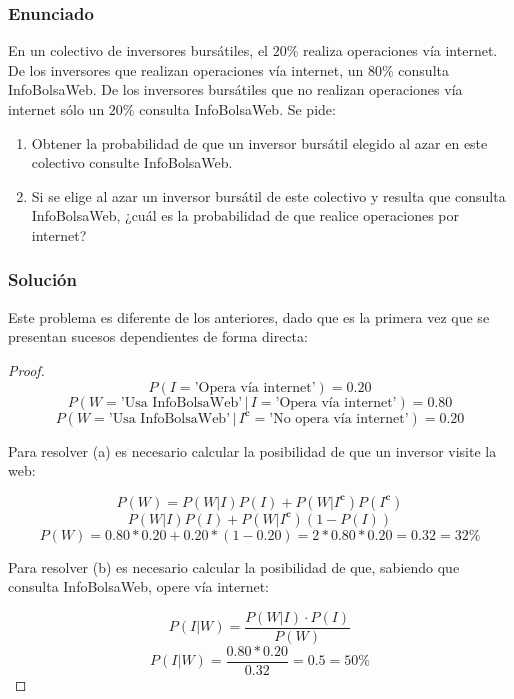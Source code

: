 \documentclass[12pt,a4paper]{article}
\begin{document}
\subsubsection{Enunciado}

En un colectivo de inversores bursátiles, el \(20\%\) realiza operaciones vía internet. De los inversores que realizan operaciones vía internet, un \(80\%\) consulta InfoBolsaWeb. De los inversores bursátiles que no realizan operaciones vía internet sólo un \(20\%\) consulta InfoBolsaWeb. Se pide:
\begin{enumerate}
  \item[a)] Obtener la probabilidad de que un inversor bursátil elegido al azar en este colectivo consulte InfoBolsaWeb.
  \item[b)] Si se elige al azar un inversor bursátil de este colectivo y resulta que consulta InfoBolsaWeb, ¿cuál es la probabilidad de que realice operaciones por internet?
\end{enumerate}

\subsubsection{Solución}

Este problema es diferente de los anteriores, dado que es la primera vez que se presentan sucesos dependientes de forma directa:

\begin{proof}

  \begin{equation*}
    P(I = \text{'Opera vía internet'})=0.20
  \end{equation*}
  \begin{equation*}
    P(W = \text{'Usa InfoBolsaWeb'}\,|\,I = \text{'Opera vía internet'})=0.80
  \end{equation*}
  \begin{equation*}
    P(W = \text{'Usa InfoBolsaWeb'}\,|\,I^{\textbf{c}} = \text{'No opera vía internet'})=0.20
  \end{equation*}

  Para resolver (a) es necesario calcular la posibilidad de que un inversor visite la web:

  \begin{equation*}
    P(W)=P(W|I)P(I)+P(W|I^{\textbf{c}})P(I^{\textbf{c}})
  \end{equation*}
  \begin{equation*}
    P(W|I)P(I)+P(W|I^{\textbf{c}})(1-P(I))
  \end{equation*}
  \begin{equation*}
    P(W)=0.80*0.20+0.20*(1-0.20)=2*0.80*0.20=0.32=32\%
  \end{equation*}

  Para resolver (b) es necesario calcular la posibilidad de que, sabiendo que consulta InfoBolsaWeb, opere vía internet:

  \begin{equation*}
    P(I|W)=\frac{P(W|I)\cdot P(I)}{P(W)}
  \end{equation*}
  \begin{equation*}
    P(I|W)=\frac{0.80*0.20}{0.32}=0.5=50\%
  \end{equation*}
\end{proof}
\end{document}
